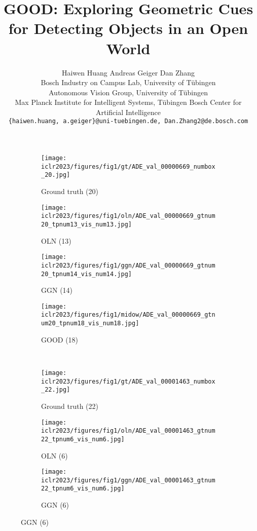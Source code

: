\documentclass{article} \usepackage{iclr2023_conference,times}
\title{GOOD: Exploring Geometric Cues for Detecting Objects in an Open World}
\author{Haiwen Huang \; Andreas Geiger \; Dan Zhang \\
Bosch Industry on Campus Lab, University of Tübingen\\ Autonomous Vision Group, University of Tübingen\\
Max Planck Institute for Intelligent Systems, Tübingen \;
Bosch Center for Artificial Intelligence\\
\texttt{\{haiwen.huang, a.geiger\}@uni-tuebingen.de, Dan.Zhang2@de.bosch.com} }
\begin{document}
\maketitle

\begin{figure}[h]
     \centering
     \begin{subfigure}[b]{0.244\textwidth}
         \centering
         \texttt{[image: iclr2023/figures/fig1/gt/ADE\_val\_00000669\_numbox\_20.jpg]}
         \caption{Ground truth (20)}
         \label{fig:y equals x}
     \end{subfigure}
     \begin{subfigure}[b]{0.244\textwidth}
         \centering
         \texttt{[image: iclr2023/figures/fig1/oln/ADE\_val\_00000669\_gtnum20\_tpnum13\_vis\_num13.jpg]}
         \caption{OLN (13)}
         \label{fig:three sin x}
     \end{subfigure}
     \begin{subfigure}[b]{0.244\textwidth}
         \centering
         \texttt{[image: iclr2023/figures/fig1/ggn/ADE\_val\_00000669\_gtnum20\_tpnum14\_vis\_num14.jpg]}
         \caption{GGN (14)}
         \label{fig:five over x}
     \end{subfigure} 
     \begin{subfigure}[b]{0.244\textwidth}
         \centering
         \texttt{[image: iclr2023/figures/fig1/midow/ADE\_val\_00000669\_gtnum20\_tpnum18\_vis\_num18.jpg]}
         \caption{GOOD (18)}
         \label{fig:five over x}
     \end{subfigure} 
     \\
     \begin{subfigure}[b]{0.244\textwidth}
         \centering
         \texttt{[image: iclr2023/figures/fig1/gt/ADE\_val\_00001463\_numbox\_22.jpg]}
         \caption{Ground truth (22)}
         \label{fig:y equals x}
     \end{subfigure}
     \begin{subfigure}[b]{0.244\textwidth}
         \centering
         \texttt{[image: iclr2023/figures/fig1/oln/ADE\_val\_00001463\_gtnum22\_tpnum6\_vis\_num6.jpg]}
         \caption{OLN (6)}
         \label{fig:three sin x}
     \end{subfigure}
     \begin{subfigure}[b]{0.244\textwidth}
         \centering
         \texttt{[image: iclr2023/figures/fig1/ggn/ADE\_val\_00001463\_gtnum22\_tpnum6\_vis\_num6.jpg]}
         \caption{GGN (6)}

\end{subfigure}
\end{figure}
\end{document}
